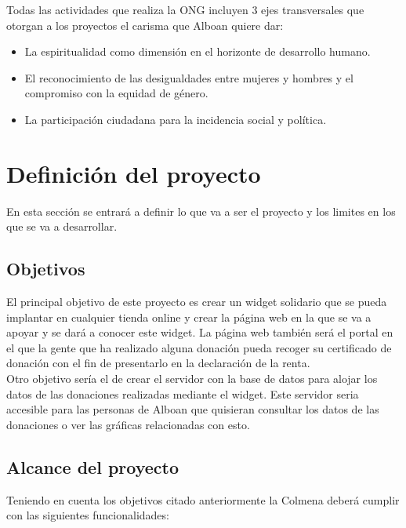 Todas las actividades que realiza la ONG incluyen 3 ejes transversales que otorgan a los proyectos el carisma que Alboan quiere dar:
\begin{itemize}
	\item La espiritualidad como dimensión en el horizonte de desarrollo humano.
	\item El reconocimiento de las desigualdades entre mujeres y hombres y el compromiso con la equidad de género.
	\item La participación ciudadana para la incidencia social y política.
\end{itemize}

\section{Definición del proyecto}
En esta sección se entrará a definir lo que va a ser el proyecto y los limites en los que se va a desarrollar.

\subsection{Objetivos}
El principal objetivo de este proyecto es crear un widget solidario que se pueda implantar en cualquier tienda online y crear la página web en la que se va a apoyar y se dará a conocer este widget. La página web también será el portal en el que la gente que ha realizado alguna donación pueda recoger su certificado de donación con el fin de presentarlo en la declaración de la renta.\\

Otro objetivo sería el de crear el servidor con la base de datos para alojar los datos de las donaciones realizadas mediante el widget. Este servidor seria accesible para las personas de Alboan que quisieran consultar los datos de las donaciones o ver las gráficas relacionadas con esto.

\subsection{Alcance del proyecto}
Teniendo en cuenta los objetivos citado anteriormente la Colmena deberá cumplir con las siguientes funcionalidades:

